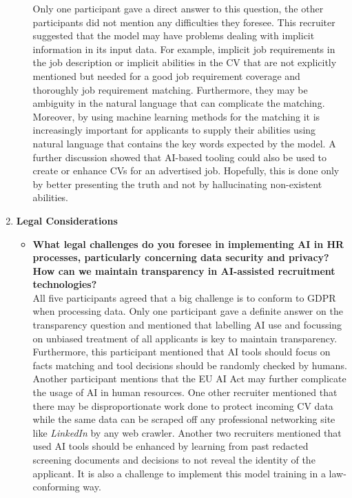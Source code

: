 \documentclass[draft,final]{thesisclass} %
\begin{document}
\begin{enumerate}
\begin{itemize}
        Only one participant gave a direct answer to this question, the other participants did not mention any difficulties they foresee.
        This recruiter suggested that the model may have problems dealing with implicit information in its input data. For example, implicit job requirements in the job description or implicit abilities in the \acs{CV} that are not explicitly mentioned but needed for a good job requirement coverage and thoroughly job requirement matching. Furthermore, they may be ambiguity in the natural language that can complicate the matching. Moreover, by using machine learning methods for the matching it is increasingly important for applicants to supply their abilities using natural language that contains the key words expected by the model. A further discussion showed that \acs{AI}-based tooling could also be used to create or enhance \acs{CV}s for an advertised job.
        Hopefully, this is done only by better presenting the truth and not by hallucinating non-existent abilities.
    \end{itemize}
    \item \textbf{Legal Considerations}
    \begin{itemize}
        \item \textbf{What legal challenges do you foresee in implementing \acs{AI} in \acs{HR} processes, particularly concerning data security and privacy? How can we maintain transparency in \acs{AI}-assisted recruitment technologies?}\\
        All five participants agreed that a big challenge is to conform to \acs{GDPR} when processing data. Only one participant gave a definite answer on the transparency question and mentioned that labelling \acs{AI} use and focussing on unbiased treatment of all applicants is key to maintain transparency. Furthermore, this participant mentioned that \acs{AI} tools should focus on facts matching and tool decisions should be randomly checked by humans. Another participant mentions that the \acs{EU AI Act} may further complicate the usage of \acs{AI} in human resources. One other recruiter mentioned that there may be disproportionate work done to protect incoming \acs{CV} data while the same data can be scraped off any professional networking site like \textit{LinkedIn} by any web crawler.
        Another two recruiters mentioned that used \acs{AI} tools should be enhanced by learning from past redacted screening documents and decisions to not reveal the identity of the applicant. It is also a challenge to implement this model training in a law-conforming way.

\end{itemize}
\end{enumerate}
\end{document}
